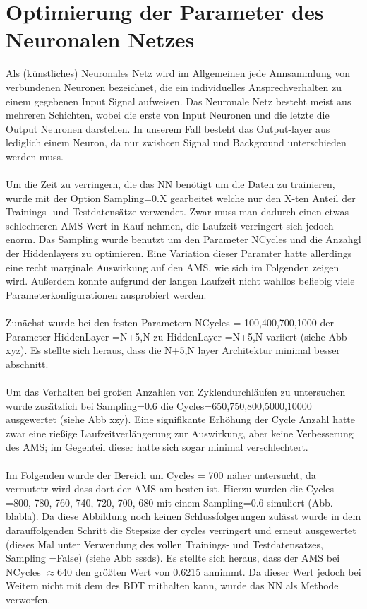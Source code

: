 \section{Optimierung der Parameter des Neuronalen Netzes}
Als (künstliches) Neuronales Netz wird im Allgemeinen jede Annsammlung von verbundenen Neuronen bezeichnet, die ein individuelles Ansprechverhalten zu einem gegebenen Input Signal aufweisen. Das Neuronale Netz besteht meist aus mehreren Schichten, wobei die erste von Input Neuronen und die letzte die Output Neuronen darstellen. In unserem Fall besteht das Output-layer aus lediglich einem Neuron, da nur zwishcen Signal und Background unterschieden werden muss.\\ \\
Um die Zeit zu verringern, die das NN benötigt um die Daten zu trainieren, wurde mit der Option Sampling=0.X gearbeitet welche nur den X-ten Anteil der Trainings- und Testdatensätze verwendet. Zwar muss man dadurch einen etwas schlechteren AMS-Wert in Kauf nehmen, die Laufzeit verringert sich jedoch enorm. Das Sampling wurde benutzt um den Parameter NCycles und die Anzahgl der Hiddenlayers zu optimieren. Eine Variation dieser Paramter hatte allerdings eine recht marginale Auswirkung auf den AMS, wie sich im Folgenden zeigen wird. Außerdem konnte aufgrund der langen Laufzeit nicht wahllos beliebig viele Parameterkonfigurationen ausprobiert werden.\\ \\
Zunächst wurde bei den festen Parametern NCycles = 100,400,700,1000 der Parameter HiddenLayer =N+5,N zu HiddenLayer =N+5,N variiert (siehe Abb xyz). Es stellte sich heraus, dass die N+5,N layer Architektur minimal besser abschnitt. \\ \\
Um das Verhalten bei großen Anzahlen von Zyklendurchläufen zu untersuchen wurde zusätzlich bei Sampling=0.6 die Cycles=650,750,800,5000,10000 ausgewertet (siehe Abb xzy). Eine signifikante Erhöhung der Cycle Anzahl hatte zwar eine rießige Laufzeitverlängerung zur Auswirkung, aber keine Verbesserung des AMS; im Gegenteil dieser hatte sich sogar minimal verschlechtert. \\ \\
Im Folgenden wurde der Bereich um Cycles = 700 näher untersucht, da vermutetr wird dass dort der AMS am besten ist. Hierzu wurden die Cycles =800, 780, 760, 740, 720, 700, 680 mit einem Sampling=0.6 simuliert (Abb. blabla). Da diese Abbildung noch keinen Schlussfolgerungen zulässt wurde in dem darauffolgenden Schritt die Stepsize der cycles verringert und erneut ausgewertet (dieses Mal unter Verwendung des vollen Trainings- und Testdatensatzes, Sampling =False) (siehe Abb sssds). Es stellte sich heraus, dass der AMS bei NCycles $\approx$640 den größten Wert von 0.6215 annimmt. Da dieser Wert jedoch bei Weitem nicht mit dem des BDT mithalten kann, wurde das NN als Methode verworfen. \\ \\